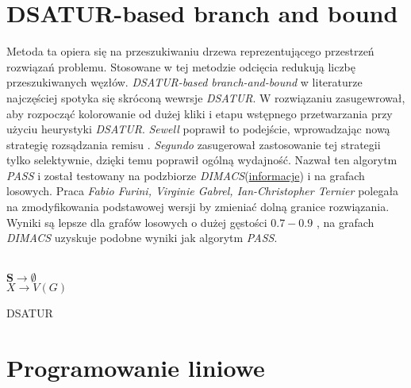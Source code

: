 \section{DSATUR-based branch and bound }
Metoda ta opiera się na przeszukiwaniu drzewa reprezentującego przestrzeń rozwiązań problemu. 
Stosowane w tej metodzie odcięcia redukują liczbę przeszukiwanych węzłów. 
\textit{DSATUR-based branch-and-bound} w literaturze najczęściej spotyka się skróconą wewrsje \textit{DSATUR}. 
W rozwiązaniu zasugewrował, aby rozpocząć kolorowanie od dużej kliki i etapu wstępnego przetwarzania przy użyciu heurystyki \textit{DSATUR}. 
\textit{Sewell} poprawił to podejście, wprowadzając nową strategię rozsądzania remisu \cite{Sewell1993AIA}.
\textit{Segundo} zasugerował zastosowanie tej strategii tylko selektywnie, dzięki temu poprawił ogólną wydajność.
Nazwał ten algorytm \textit{PASS} i został testowany na podzbiorze \textit{DIMACS}(\href{http://archive.dimacs.rutgers.edu/Challenges/}{informacje}) i na 
grafach losowych. Praca \textit{Fabio Furini, Virginie Gabrel, Ian-Christopher Ternier} polegała na zmodyfikowania podstawowej wersji by zmieniać dolną granice rozwiązania. 
Wyniki są lepsze dla grafów losowych o dużej gęstości $0.7 - 0.9$ \cite{furini}, na grafach \textit{DIMACS} uzyskuje podobne wyniki jak algorytm \textit{PASS}.
\\ \

\begin{algorithm}[H]
    \newenvironment{polishalgorithm}[1][]
    \KwData{graf G}
    $\mathbf{S} \rightarrow \emptyset$ \\
    $X \rightarrow V(G) $ \\
    \caption{DSATUR}
    \label{DSATUR}
\end{algorithm}

\section{Programowanie liniowe}

